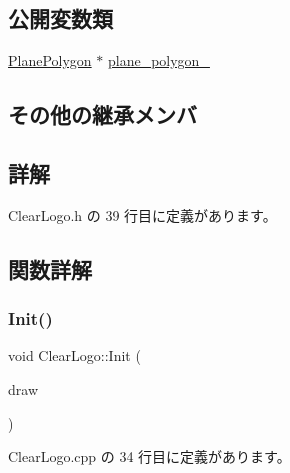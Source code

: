 \subsection*{公開変数類}
\begin{DoxyCompactItemize}
\item 
\mbox{\hyperlink{class_plane_polygon}{Plane\+Polygon}} $\ast$ \mbox{\hyperlink{class_clear_logo_ad4c1abbd7e501cc44357c9f65e12482f}{plane\+\_\+polygon\+\_\+}}
\end{DoxyCompactItemize}
\subsection*{その他の継承メンバ}


\subsection{詳解}


 Clear\+Logo.\+h の 39 行目に定義があります。



\subsection{関数詳解}
\mbox{\label{class_clear_logo_a46c1a948342d75bb418047a31e70999d}} 
\subsubsection{\texorpdfstring{Init()}{Init()}}
{\footnotesize\ttfamily void Clear\+Logo\+::\+Init (\begin{DoxyParamCaption}\item[{\mbox{\hyperlink{class_draw_base}{Draw\+Base}} $\ast$}]{draw }\end{DoxyParamCaption})}



 Clear\+Logo.\+cpp の 34 行目に定義があります。

